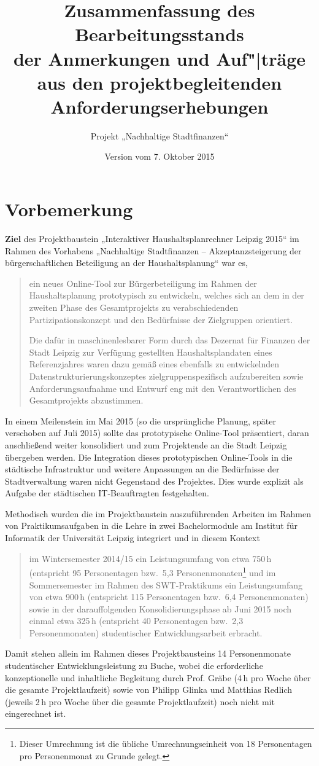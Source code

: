 \documentclass[11pt,a4paper,twoside]{article}
\title{Zusammenfassung des Bearbeitungsstands\\[3pt] der Anmerkungen und
  Auf"|träge\\[3pt] aus den projektbegleitenden Anforderungserhebungen}
\author{Projekt „Nachhaltige Stadtfinanzen“}
\date{Version vom 7. Oktober 2015}
\begin{document}
\maketitle
\tableofcontents
\thispagestyle{empty}
\seitezwei
\newpage

\section{Vorbemerkung}

\textbf{Ziel} des Projektbaustein „Interaktiver Haushaltsplanrechner Leipzig
2015“ im Rahmen des Vorhabens „Nachhaltige Stadtfinanzen – Akzeptanzsteigerung
der bürgerschaftlichen Beteiligung an der Haushaltsplanung“ war es,
\begin{quote}
  ein neues Online-Tool zur Bürgerbeteiligung im Rahmen der Haushaltsplanung
  prototypisch zu entwickeln, welches sich an dem in der zweiten Phase des
  Gesamtprojekts zu verabschiedenden Partizipationskonzept und den Bedürfnisse
  der Zielgruppen orientiert.

Die dafür in maschinenlesbarer Form durch das Dezernat für Finanzen der Stadt
Leipzig zur Verfügung gestellten Haushaltsplandaten eines Referenzjahres waren
dazu gemäß eines ebenfalls zu entwickelnden Datenstrukturierungskonzeptes
zielgruppenspezifisch aufzubereiten sowie Anforderungsaufnahme und Entwurf eng
mit den Verantwortlichen des Gesamtprojekts abzustimmen.
\end{quote}
In einem Meilenstein im Mai 2015 (so die ursprüngliche Planung, später
verschoben auf Juli 2015) sollte das prototypische Online-Tool präsentiert,
daran anschließend weiter konsolidiert und zum Projektende an die Stadt Leipzig
übergeben werden. Die Integration dieses prototypischen Online-Tools in die
städtische Infrastruktur und weitere Anpassungen an die Bedürfnisse der
Stadtverwaltung waren nicht Gegenstand des Projektes. Dies wurde explizit als
Aufgabe der städtischen IT-Beauftragten festgehalten.

Methodisch wurden die im Projektbaustein auszuführenden Arbeiten im Rahmen von
Praktikumsaufgaben in die Lehre in zwei Bachelormodule am Institut für
Informatik der Universität Leipzig integriert und in diesem Kontext
\begin{quote}
  im Wintersemester 2014/15 ein Leistungsumfang von etwa 750\,h (entspricht 95
  Personentagen bzw.\ 5{,}3 Personenmonaten\footnote{Dieser Umrechnung ist die
    übliche Umrechnungseinheit von 18 Personentagen pro Personenmonat zu
    Grunde gelegt.} und im Sommersemester im Rahmen des SWT-Praktikums ein
  Leistungsumfang von etwa 900\,h (entspricht 115 Personentagen bzw.\ 6{,}4
  Personenmonaten) sowie in der darauffolgenden Konsolidierungsphase ab Juni
  2015 noch einmal etwa 325\,h (entspricht 40 Personentagen bzw.\ 2{,}3
  Personenmonaten) studentischer Entwicklungsarbeit erbracht.
\end{quote}
Damit stehen allein im Rahmen dieses Projektbausteins 14 Personenmonate
studentischer Entwicklungsleistung zu Buche, wobei die erforderliche
konzeptionelle und inhaltliche Begleitung durch Prof. Gräbe (4\,h pro Woche
über die gesamte Projektlaufzeit) sowie von Philipp Glinka und Matthias
Redlich (jeweils 2\,h pro Woche über die gesamte Projektlaufzeit) noch nicht
mit eingerechnet ist.
\end{document}
